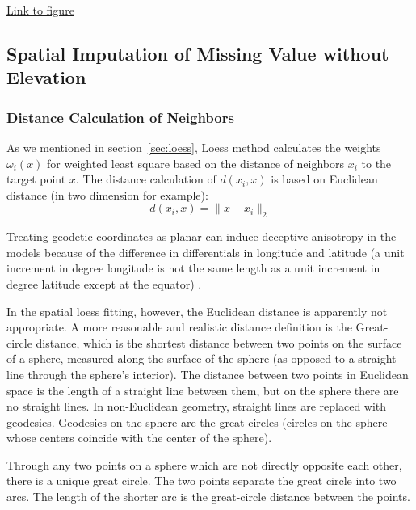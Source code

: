 \begin{framed}
\begin{center}
  \href{../plots/tmax.a1950.status.pdf}
  {Link to figure}
  \label{a1950.status}
\end{center}
\end{framed}


\subsection{Spatial Imputation of Missing Value without Elevation}
\label{sec:impute.w/o.elev}

\subsubsection{Distance Calculation of Neighbors}

As we mentioned in section~\ref{sec:loess}, Loess method calculates the weights 
$\omega_i(x)$
for weighted least square based on the distance of neighbors $x_i$ to the target 
point $x$. The distance calculation of $d(x_i, x)$ is based on Euclidean distance 
(in two dimension for example):
$$
d(x_i, x) = \| x - x_i \|_2
$$

Treating geodetic coordinates as
planar can induce deceptive anisotropy in the models because
of the difference in differentials in longitude and latitude (a
unit increment in degree longitude is not the same length as
a unit increment in degree latitude except at the equator) \cite{banerjee2005geodetic}.

In the spatial loess fitting, however, the Euclidean distance is apparently not 
appropriate. A more reasonable and realistic distance definition is the Great-circle 
distance, which is the shortest distance between two points on the surface of a 
sphere, measured along the surface of the sphere (as opposed to a straight line 
through the sphere's interior). The distance between two points in Euclidean 
space is the length of a straight line between them, but on the sphere there are 
no straight lines. In non-Euclidean geometry, straight lines are replaced with 
geodesics. Geodesics on the sphere are the great circles (circles on the sphere 
whose centers coincide with the center of the sphere).

Through any two points on a sphere which are not directly opposite each other, 
there is a unique great circle. The two points separate the great circle into 
two arcs. The length of the shorter arc is the great-circle distance between the 
points\cite{greatcircle}.

